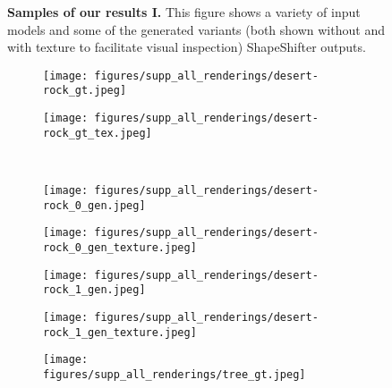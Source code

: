 \begin{figure*}[!h]
    \caption{\textbf{Samples of our results I.} This figure shows a variety of input models and some of the generated variants (both shown without and with texture to facilitate visual inspection) ShapeShifter outputs.}
\label{fig:all_renderings0}
\end{figure*}



    
\begin{figure*}[!h]
    \centering
    \begin{subfigure}{.16\linewidth}
        \centering
        \texttt{[image: figures/supp\_all\_renderings/desert-rock\_gt.jpeg]}
    \end{subfigure}
    \begin{subfigure}{.16\linewidth}
        \centering
        \texttt{[image: figures/supp\_all\_renderings/desert-rock\_gt\_tex.jpeg]}
    \end{subfigure}
    \unskip\ \vrule\ 
    \begin{subfigure}{.16\linewidth}
        \centering
        \texttt{[image: figures/supp\_all\_renderings/desert-rock\_0\_gen.jpeg]}
    \end{subfigure}
    \begin{subfigure}{.16\linewidth}
        \centering
        \texttt{[image: figures/supp\_all\_renderings/desert-rock\_0\_gen\_texture.jpeg]}
    \end{subfigure}
    \begin{subfigure}{.16\linewidth}
        \centering
        \texttt{[image: figures/supp\_all\_renderings/desert-rock\_1\_gen.jpeg]}
    \end{subfigure}
    \begin{subfigure}{.16\linewidth}
        \centering
        \texttt{[image: figures/supp\_all\_renderings/desert-rock\_1\_gen\_texture.jpeg]}
    \end{subfigure}
    \vspace*{-5mm} 
    \begin{subfigure}{.16\linewidth}
        \centering
        \texttt{[image: figures/supp\_all\_renderings/tree\_gt.jpeg]}
    \end{subfigure}

\end{figure*}
